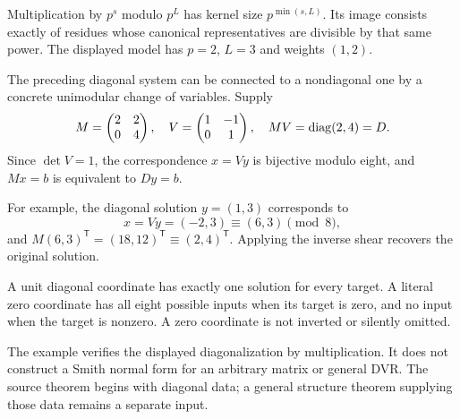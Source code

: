 Multiplication by $p^s$ modulo $p^L$ has kernel size $p^{\min(s,L)}$. Its image consists exactly of residues whose canonical representatives are divisible by that same power. The displayed model has $p=2$, $L=3$ and weights $(1,2)$.


The preceding diagonal system can be connected to a nondiagonal one by a concrete unimodular change of variables. Supply
\[
M=\begin{pmatrix}2&2\\0&4\end{pmatrix},\quad
V=\begin{pmatrix}1&-1\\0&1\end{pmatrix},\quad
MV=\operatorname{diag}(2,4)=D.
\]
Since $\det V=1$, the correspondence $x=Vy$ is bijective modulo eight, and $Mx=b$ is equivalent to $Dy=b$.


For example, the diagonal solution $y=(1,3)$ corresponds to
\[
x=Vy=(-2,3)\equiv(6,3)\pmod8,
\]
and $M(6,3)^\mathsf T=(18,12)^\mathsf T\equiv(2,4)^\mathsf T$. Applying the inverse shear recovers the original solution.

A unit diagonal coordinate has exactly one solution for every target. A literal zero coordinate has all eight possible inputs when its target is zero, and no input when the target is nonzero. A zero coordinate is not inverted or silently omitted.

The example verifies the displayed diagonalization by multiplication. It does not construct a Smith normal form for an arbitrary matrix or general DVR. The source theorem begins with diagonal data; a general structure theorem supplying those data remains a separate input.


